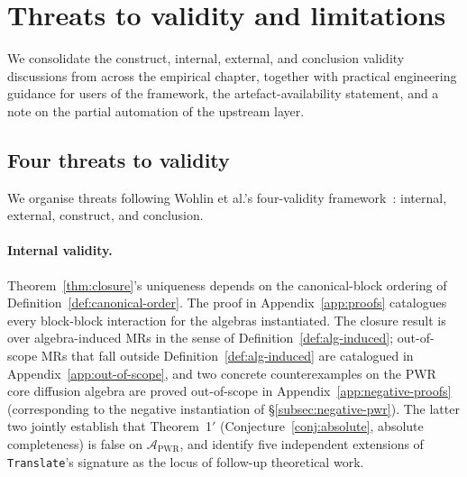\documentclass[acmsmall, screen]{acmart}
\begin{document}
\section{Threats to validity and limitations}
\label{sec:threats-limitations}

We consolidate the construct, internal, external, and conclusion validity discussions from across the empirical chapter, together with practical engineering guidance for users of the framework, the artefact-availability statement, and a note on the partial automation of the upstream layer.

\subsection{Four threats to validity}

We organise threats following Wohlin et al.'s four-validity framework~\cite{Wohlin2012EmpiricalSE}: internal, external, construct, and conclusion.

\paragraph{Internal validity.} Theorem~\ref{thm:closure}'s uniqueness depends on the canonical-block ordering of Definition~\ref{def:canonical-order}. The proof in Appendix~\ref{app:proofs} catalogues every block-block interaction for the algebras instantiated. The closure result is over algebra-induced MRs in the sense of Definition~\ref{def:alg-induced}; out-of-scope MRs that fall outside Definition~\ref{def:alg-induced} are catalogued in Appendix~\ref{app:out-of-scope}, and two concrete counterexamples on the PWR core diffusion algebra are proved out-of-scope in Appendix~\ref{app:negative-proofs} (corresponding to the negative instantiation of \S\ref{subsec:negative-pwr}). The latter two jointly establish that Theorem~1$'$ (Conjecture~\ref{conj:absolute}, absolute completeness) is false on $\mathcal{A}_{\mathrm{PWR}}$, and identify five independent extensions of \texttt{Translate}'s signature as the locus of follow-up theoretical work.
\end{document}
